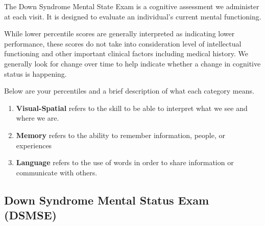 The Down Syndrome Mental State Exam is a cognitive assessment we administer at each visit. It is designed to evaluate an individual’s current mental functioning. 

While lower percentile scores are generally interpreted as indicating lower performance, these scores do not take into consideration level of intellectual functioning and other important clinical factors including medical history. We generally look for change over time to help indicate whether a change in cognitive status is happening. 

Below are your percentiles and a brief description of what each category means. 

\begin{enumerate}
    \item \textbf{Visual-Spatial} refers to the skill to be able to interpret what we see and where we are. 
    \item \textbf{Memory} refers to the ability to remember information, people, or experiences
    \item \textbf{Language} refers to the use of words in order to share information or communicate with others. 
    
\end{enumerate}

\subsection{Down Syndrome Mental Status Exam (DSMSE)}